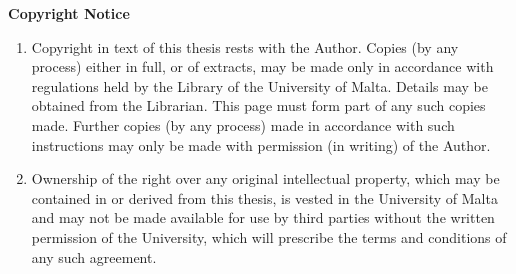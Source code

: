 \vspace*{\fill}

\begin{center}
    \textbf{Copyright Notice}
\end{center}

\begin{enumerate}
    \item Copyright in text of this thesis rests with the Author.
    Copies (by any process) either in full, or of extracts, may be made only in
    accordance with regulations held by the Library of the University of Malta.
    Details may be obtained from the Librarian.
    This page must form part of any such copies made. Further copies (by any
    process) made in accordance with such instructions may only be made with
    permission (in writing) of the Author.
    \item Ownership of the right over any original intellectual property, which
    may be contained in or derived from this thesis, is vested in the
    University of Malta and may not be made available for use by third parties
    without the written permission of the University, which will prescribe the
    terms and conditions of any such agreement.
\end{enumerate}

\vfill\cleardoublepage{}
